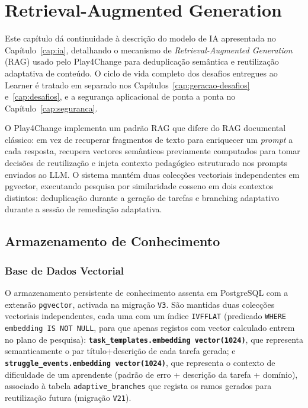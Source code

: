 %
%
\chapter{Retrieval-Augmented Generation} \label{cap:rag}

Este capítulo dá continuidade à descrição do modelo de IA apresentada no Capítulo~\ref{cap:ia}, detalhando o mecanismo de \textit{Retrieval-Augmented Generation} (RAG) usado pelo Play4Change para deduplicação semântica e reutilização adaptativa de conteúdo. O ciclo de vida completo dos desafios entregues ao Learner é tratado em separado nos Capítulos~\ref{cap:geracao-desafios} e~\ref{cap:desafios}, e a segurança aplicacional de ponta a ponta no Capítulo~\ref{cap:seguranca}.

O Play4Change implementa um padrão RAG que difere do RAG documental clássico: em vez de recuperar fragmentos de texto para enriquecer um \textit{prompt} a cada resposta, recupera vectores semânticos previamente computados para tomar decisões de reutilização e injeta contexto pedagógico estruturado nos prompts enviados ao LLM.
O sistema mantém duas colecções vectoriais independentes em pgvector, executando pesquisa por similaridade cosseno em dois contextos distintos: deduplicação durante a geração de tarefas e branching adaptativo durante a sessão de remediação adaptativa.

\section{Armazenamento de Conhecimento} \label{sec:armazenamento}

\subsection*{Base de Dados Vectorial}

O armazenamento persistente de conhecimento assenta em PostgreSQL com a extensão \texttt{pgvector}, activada na migração \texttt{V3}.
São mantidas duas colecções vectoriais independentes, cada uma com um índice \texttt{IVFFLAT} (predicado \texttt{WHERE embedding IS NOT NULL}, para que apenas registos com vector calculado entrem no plano de pesquisa): \textbf{\texttt{task\_templates.embedding vector(1024)}}, que representa semanticamente o par título+descrição de cada tarefa gerada; e \textbf{\texttt{struggle\_events.embedding vector(1024)}}, que representa o contexto de dificuldade de um aprendente (padrão de erro + descrição da tarefa + domínio), associado à tabela \texttt{adaptive\_branches} que regista os ramos gerados para reutilização futura (migração \texttt{V21}).


